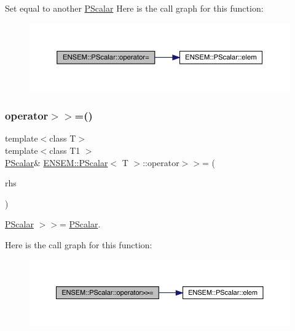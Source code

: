 Set equal to another \mbox{\hyperlink{classENSEM_1_1PScalar}{P\+Scalar}} Here is the call graph for this function\+:
\nopagebreak
\begin{figure}[H]
\begin{center}
\leavevmode
\includegraphics[width=350pt]{d3/d27/classENSEM_1_1PScalar_ae69d6f1ad8ec0b65652f8d16c5f97b11_cgraph}
\end{center}
\end{figure}
\mbox{\label{classENSEM_1_1PScalar_a8fe07cd0462ddff9e3d0858ebe29e77c}} 
\subsubsection{\texorpdfstring{operator$>$$>$=()}{operator>>=()}\hspace{0.1cm}{\footnotesize\ttfamily [1/3]}}
{\footnotesize\ttfamily template$<$class T$>$ \\
template$<$class T1 $>$ \\
\mbox{\hyperlink{classENSEM_1_1PScalar}{P\+Scalar}}\& \mbox{\hyperlink{classENSEM_1_1PScalar}{E\+N\+S\+E\+M\+::\+P\+Scalar}}$<$ T $>$\+::operator$>$$>$= (\begin{DoxyParamCaption}\item[{const \mbox{\hyperlink{classENSEM_1_1PScalar}{P\+Scalar}}$<$ T1 $>$ \&}]{rhs }\end{DoxyParamCaption})\hspace{0.3cm}{\ttfamily [inline]}}



\mbox{\hyperlink{classENSEM_1_1PScalar}{P\+Scalar}} $>$$>$= \mbox{\hyperlink{classENSEM_1_1PScalar}{P\+Scalar}}. 

Here is the call graph for this function\+:
\nopagebreak
\begin{figure}[H]
\begin{center}
\leavevmode
\includegraphics[width=350pt]{d3/d27/classENSEM_1_1PScalar_a8fe07cd0462ddff9e3d0858ebe29e77c_cgraph}
\end{center}
\end{figure}
\mbox{\label{classENSEM_1_1PScalar_a8fe07cd0462ddff9e3d0858ebe29e77c}} 
